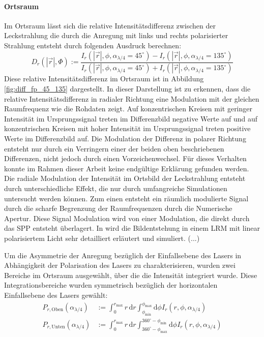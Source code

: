 \documentclass[titlepage,  ngerman]{article}
\begin{document}
		\paragraph{Ortsraum}
		Im Ortsraum lässt sich die relative Intensitätsdifferenz zwischen der Leckstrahlung die durch die Anregung mit links und rechts polarisierter Strahlung entsteht durch folgenden Ausdruck berechnen:
		\begin{equation}
		 	\label{eq:diff_measure}
			D_r\left(|\vec{r}|, \Phi\right) := \dfrac{I_r(|\vec{r}|, \phi, \alpha_{\lambda /4} = 45^\circ) - I_r(|\vec{r}|, \phi, \alpha_{\lambda /4} = 135^\circ)}{I_r(|\vec{r}|, \phi, \alpha_{\lambda /4} = 45^\circ) + I_r(|\vec{r}|, \phi, \alpha_{\lambda /4} = 135^\circ)}
		\end{equation} 
		 Diese relative Intensitätsdifferenz im Ortsraum ist in Abbildung \ref{fig:diff_fp_45_135} dargestellt. In dieser Darstellung ist zu erkennen, dass die relative Intensitätsdifferenz in radialer Richtung eine Modulation mit der gleichen Raumfrequenz wie die Rohdaten zeigt. Auf konzentrischen Kreisen mit geringer Intensität im Ursprungssignal treten im Differenzbild negative Werte auf und auf konzentrischen Kreisen mit hoher Intensität im Ursprungssignal treten positive Werte im Differenzbild auf. Die Modulation der Differenz in polarer Richtung entsteht nur durch ein Verringern einer der beiden oben beschriebenen Differenzen, nicht jedoch durch einen Vorzeichenwechsel. Für dieses Verhalten konnte im Rahmen dieser Arbeit keine endgültige Erklärung gefunden werden. Die radiale Modulation der Intensität im Ortsbild der Leckstrahlung entsteht durch unterschiedliche Effekt, die nur durch umfangreiche Simulationen untersucht werden können. Zum einen entsteht ein räumlich modulierte Signal durch die scharfe Begrenzung der Raumfrequenzen durch die Numerische Apertur. Diese Signal Modulation wird von einer Modulation, die direkt durch das SPP entsteht überlagert.  In \cite{Hohenau.2011} wird die Bildentstehung in einem LRM mit linear polarisiertem Licht sehr detailliert erläutert und simuliert. (...)
		 
		 Um die Asymmetrie der Anregung bezüglich der Einfallsebene des Lasers in Abhängigkeit der Polarisation des Lasers zu charakterisieren, wurden zwei Bereiche im Ortsraum ausgewählt, über die die Intensität integriert wurde. Diese Integrationsbereiche wurden symmetrisch bezüglich der horizontalen Einfallsebene des Lasers gewählt:		 
		 \begin{align}
		 	P_{r, \mathrm{Oben}}(\alpha_{\lambda/4}) &:= \int_{0}^{r_\mathrm{max}}r \, \mathrm{d}r \int_{\phi_\mathrm{min}}^{\phi_\mathrm{max}} \mathrm{d}\phi I_r(r, \phi, \alpha_{\lambda /4}) \\
		 	\nonumber
		 	P_{r, \mathrm{Unten}}(\alpha_{\lambda/4}) &:= \int_{0}^{r_\mathrm{max}}r \, \mathrm{d}r \int_{360^\circ -\phi_\mathrm{max}}^{360^\circ - \phi_\mathrm{min}} \mathrm{d}\phi I_r(r, \phi, \alpha_{\lambda/4})		 	
		 \end{align}
	 
\end{document}
